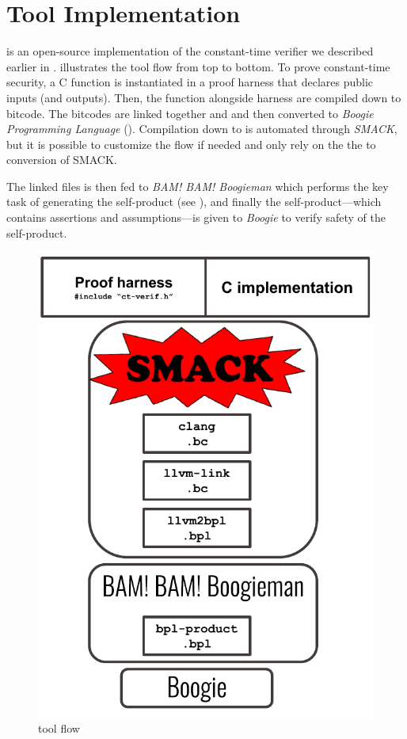 \section{Tool Implementation}

\ctVerif is an open-source implementation of the constant-time verifier we
described earlier in .  illustrates the
tool flow from top to bottom. To prove constant-time security, a C function is
instantiated in a proof harness that declares public inputs (and outputs). Then,
the function alongside harness are compiled down to  bitcode. The
bitcodes are linked together and and then converted to \emph{Boogie Programming
Language} (). Compilation down to  is automated
through \emph{SMACK}\cite{smack}, but it is possible to customize the flow if
needed and only rely on the the  to  conversion
of SMACK.

The linked  files is then fed to \emph{BAM! BAM! Boogieman} which
performs the key task of generating the self-product (see ), and
finally the self-product---which contains assertions and assumptions---is
given to \emph{Boogie}\cite{boogie} to verify safety of the self-product.


\begin{figure}[h]
    \centering
    \includegraphics[height=0.4\textheight]{figs/ct-verif-flow.pdf}
    \caption{\ctVerif tool flow}
    \label{fig:ct-verif-flow}
\end{figure}




